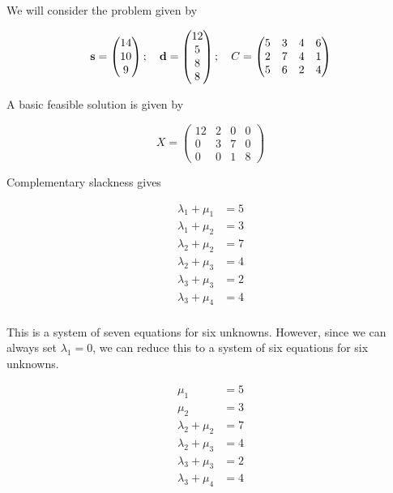 \noindent We will consider the problem given by

\[
	\vb s = \begin{pmatrix}
		14 \\ 10 \\ 9
	\end{pmatrix};\quad \vb d = \begin{pmatrix}
		12 \\ 5 \\ 8 \\ 8
	\end{pmatrix};\quad C = \begin{pmatrix}
		5 & 3 & 4 & 6 \\
		2 & 7 & 4 & 1 \\
		5 & 6 & 2 & 4
	\end{pmatrix}
\]

\noindent A basic feasible solution is given by

\[
	X = \begin{pmatrix}
		12 & 2 & 0 & 0 \\
		0  & 3 & 7 & 0 \\
		0  & 0 & 1 & 8
	\end{pmatrix}
\]

\noindent Complementary slackness gives

\begin{align*}
	\lambda_1 + \mu_1 & = 5 \\
	\lambda_1 + \mu_2 & = 3 \\
	\lambda_2 + \mu_2 & = 7 \\
	\lambda_2 + \mu_3 & = 4 \\
	\lambda_3 + \mu_3 & = 2 \\
	\lambda_3 + \mu_4 & = 4 \\
\end{align*}

\noindent This is a system of seven equations for six unknowns.
However, since we can always set \( \lambda_1 = 0 \), we can reduce this to a system of six equations for six unknowns.

\begin{align*}
	\mu_1             & = 5 \\
	\mu_2             & = 3 \\
	\lambda_2 + \mu_2 & = 7 \\
	\lambda_2 + \mu_3 & = 4 \\
	\lambda_3 + \mu_3 & = 2 \\
	\lambda_3 + \mu_4 & = 4 \\
\end{align*}

